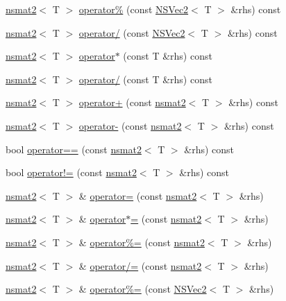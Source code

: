 \begin{DoxyCompactItemize}
\item 
\hyperlink{structnsmat2}{nsmat2}$<$ T $>$ \hyperlink{structnsmat2_a54b2258a311cf81f688b3e5afe72bb4b}{operator\%} (const \hyperlink{structNSVec2}{N\-S\-Vec2}$<$ T $>$ \&rhs) const 
\item 
\hyperlink{structnsmat2}{nsmat2}$<$ T $>$ \hyperlink{structnsmat2_abe3d7fd18d03a937324d6bf770511889}{operator/} (const \hyperlink{structNSVec2}{N\-S\-Vec2}$<$ T $>$ \&rhs) const 
\item 
\hyperlink{structnsmat2}{nsmat2}$<$ T $>$ \hyperlink{structnsmat2_a4ff75c8b0f9d3f580dfca342b4ca2050}{operator$\ast$} (const T \&rhs) const 
\item 
\hyperlink{structnsmat2}{nsmat2}$<$ T $>$ \hyperlink{structnsmat2_abd7368de50af93658383343a8576cb13}{operator/} (const T \&rhs) const 
\item 
\hyperlink{structnsmat2}{nsmat2}$<$ T $>$ \hyperlink{structnsmat2_a4dd54be680f84c4a4f819c97d4db843e}{operator+} (const \hyperlink{structnsmat2}{nsmat2}$<$ T $>$ \&rhs) const 
\item 
\hyperlink{structnsmat2}{nsmat2}$<$ T $>$ \hyperlink{structnsmat2_a0425bee724e3e659b21cb1b2d5421200}{operator-\/} (const \hyperlink{structnsmat2}{nsmat2}$<$ T $>$ \&rhs) const 
\item 
bool \hyperlink{structnsmat2_abc36f6d1ce194dad8dfa942638e22e27}{operator==} (const \hyperlink{structnsmat2}{nsmat2}$<$ T $>$ \&rhs) const 
\item 
bool \hyperlink{structnsmat2_a22a0b2dda140c20b466e945195298f53}{operator!=} (const \hyperlink{structnsmat2}{nsmat2}$<$ T $>$ \&rhs) const 
\item 
\hyperlink{structnsmat2}{nsmat2}$<$ T $>$ \& \hyperlink{structnsmat2_aed2ddd231be80bcf5eeb493932e62c17}{operator=} (const \hyperlink{structnsmat2}{nsmat2}$<$ T $>$ \&rhs)
\item 
\hyperlink{structnsmat2}{nsmat2}$<$ T $>$ \& \hyperlink{structnsmat2_aa07dbaac9da3393bb6dd274197d70769}{operator$\ast$=} (const \hyperlink{structnsmat2}{nsmat2}$<$ T $>$ \&rhs)
\item 
\hyperlink{structnsmat2}{nsmat2}$<$ T $>$ \& \hyperlink{structnsmat2_aa828e531e3c96f77597dede4d6af0f1f}{operator\%=} (const \hyperlink{structnsmat2}{nsmat2}$<$ T $>$ \&rhs)
\item 
\hyperlink{structnsmat2}{nsmat2}$<$ T $>$ \& \hyperlink{structnsmat2_a1b1a6615bdf8f4346d87e1719277c4dd}{operator/=} (const \hyperlink{structnsmat2}{nsmat2}$<$ T $>$ \&rhs)
\item 
\hyperlink{structnsmat2}{nsmat2}$<$ T $>$ \& \hyperlink{structnsmat2_a6515cd7dc9c4028c14227e4fdcfb0f61}{operator\%=} (const \hyperlink{structNSVec2}{N\-S\-Vec2}$<$ T $>$ \&rhs)

\end{DoxyCompactItemize}
